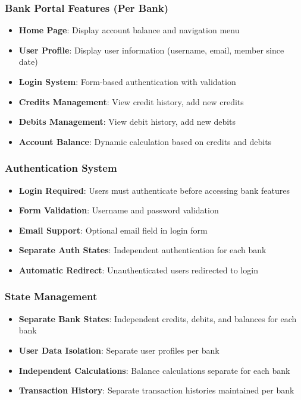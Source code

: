 \documentclass[11pt,a4paper]{article}
\begin{document}
\subsubsection{Bank Portal Features (Per Bank)}
\begin{itemize}[leftmargin=*]
    \item \textbf{Home Page}: Display account balance and navigation menu
    \item \textbf{User Profile}: Display user information (username, email, member since date)
    \item \textbf{Login System}: Form-based authentication with validation
    \item \textbf{Credits Management}: View credit history, add new credits
    \item \textbf{Debits Management}: View debit history, add new debits
    \item \textbf{Account Balance}: Dynamic calculation based on credits and debits
\end{itemize}

\subsubsection{Authentication System}
\begin{itemize}[leftmargin=*]
    \item \textbf{Login Required}: Users must authenticate before accessing bank features
    \item \textbf{Form Validation}: Username and password validation
    \item \textbf{Email Support}: Optional email field in login form
    \item \textbf{Separate Auth States}: Independent authentication for each bank
    \item \textbf{Automatic Redirect}: Unauthenticated users redirected to login
\end{itemize}

\subsubsection{State Management}
\begin{itemize}[leftmargin=*]
    \item \textbf{Separate Bank States}: Independent credits, debits, and balances for each bank
    \item \textbf{User Data Isolation}: Separate user profiles per bank
    \item \textbf{Independent Calculations}: Balance calculations separate for each bank
    \item \textbf{Transaction History}: Separate transaction histories maintained per bank
\end{itemize}
\end{document}
